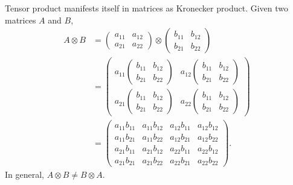 \documentclass{beamer}
\begin{document}
\begin{frame}
\justify
Tensor product manifests itself in matrices as Kronecker product. Given two matrices $A$ and $B$,
\begin{align}
A \otimes B & = \begin{pmatrix} a_{11} & a_{12} \\ a_{21} & a_{22} \end{pmatrix} \otimes \begin{pmatrix} b_{11} & b_{12} \\ b_{21} & b_{22} \end{pmatrix} \nonumber \\
& = \begin{pmatrix} a_{11} \begin{pmatrix} b_{11} & b_{12} \\ b_{21} & b_{22} \end{pmatrix} & a_{12} \begin{pmatrix} b_{11} & b_{12} \\ b_{21} & b_{22} \end{pmatrix} \\ a_{21} \begin{pmatrix} b_{11} & b_{12} \\ b_{21} & b_{22} \end{pmatrix} & a_{22} \begin{pmatrix} b_{11} & b_{12} \\ b_{21} & b_{22} \end{pmatrix} \end{pmatrix} \nonumber \\
& = \begin{pmatrix} a_{11}b_{11} & a_{11}b_{12} & a_{12}b_{11} & a_{12}b_{12} \\ a_{11}b_{21} & a_{11}b_{22} & a_{12}b_{21} & a_{12}b_{22} \\ a_{21}b_{11} & a_{21}b_{12} & a_{22}b_{11} & a_{22}b_{12} \\ a_{21}b_{21} & a_{21}b_{22} & a_{22}b_{21} & a_{22}b_{22} \end{pmatrix}.
\end{align}
\vfill
In general, $A \otimes B \neq B \otimes A$.
\end{frame}
\end{document}
